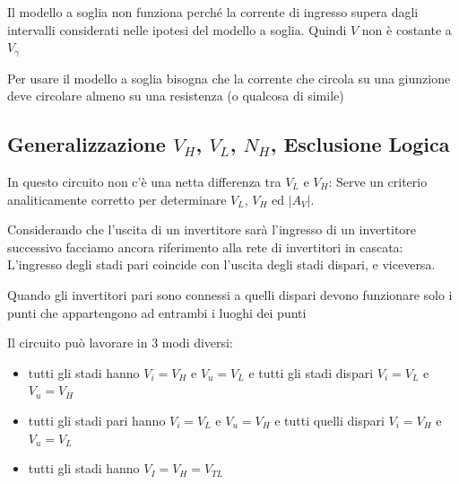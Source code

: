 \documentclass{article}
\begin{document}
Il modello a soglia non funziona perché la corrente di ingresso supera dagli intervalli considerati nelle ipotesi del modello a soglia. Quindi $V$ non è costante a $V_\gamma$

Per usare il modello a soglia bisogna che la corrente che circola su una giunzione deve circolare almeno su una resistenza (o qualcosa di simile)

\subsection{Generalizzazione $V_H$, $V_L$, $N_H$, Esclusione Logica}

In questo circuito non c'è una netta differenza tra $V_L$ e $V_H$: Serve un criterio analiticamente corretto per determinare $V_L$, $V_H$ ed $|A_V|$.

Considerando che l'uscita di un invertitore sarà l'ingresso di un invertitore successivo facciamo ancora riferimento alla rete di invertitori in cascata: L'ingresso degli stadi pari coincide con l'uscita degli stadi dispari, e viceversa.


Quando gli invertitori pari sono connessi a quelli dispari devono funzionare solo i punti che appartengono ad entrambi i luoghi dei punti

Il circuito può lavorare in 3 modi diversi:
\begin{itemize}
    \item tutti gli stadi hanno $V_i = V_H$ e $V_u = V_L$ e tutti gli stadi dispari $V_i = V_L$ e $V_u = V_H$
    \item tutti gli stadi pari hanno $V_i = V_L$ e $V_u = V_H$ e tutti quelli dispari $V_i = V_H$ e $V_u = V_L$
    \item tutti gli stadi hanno $V_I = V_H = V_{TL}$
\end{itemize}
\end{document}
